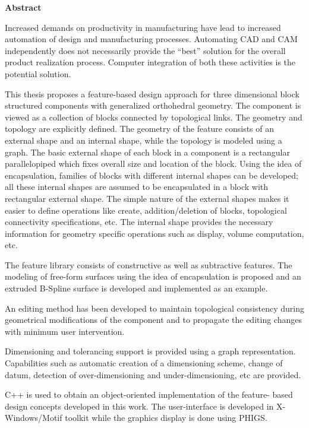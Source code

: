 \thispagestyle{empty}
\begin{center}
{\huge \bf {Abstract}}
\end{center}

\vspace{0.2in}

    Increased demands on productivity in manufacturing have lead to increased
	automation of design and manufacturing processes.
    Automating CAD and CAM independently does not necessarily provide the 
	``best'' solution for the overall product realization process.
	Computer integration of both these activities is the potential solution.

    This thesis proposes a feature-based design approach for three
    dimensional block structured components with generalized orthohedral
	geometry. 
	The component is viewed as a collection of blocks connected by 
	topological links. The geometry and topology are explicitly defined.
	The geometry of the feature consists of an external shape and an internal
	shape, while the topology is modeled using a graph. The basic external 
	shape of each block in a component is a rectangular parallelopiped which
	fixes overall size and location of the block.
	Using the idea of encapsulation, families of blocks with different internal 	shapes can be developed; all these internal shapes are assumed to be
	encapsulated in a block with rectangular external shape. The simple 
	nature
	of the external shapes makes it easier to define operations like create, 
	addition/deletion of blocks, topological connectivity specifications, etc.
	The internal shape provides the necessary information for geometry specific
	operations such as display, volume computation, etc.

    The feature library consists of constructive as well as subtractive 
	features. The modeling of free-form surfaces using the
	idea of encapsulation is proposed and an extruded B-Spline 
	surface is developed and implemented as an example.


	An editing method has been developed to maintain topological consistency 
	during geometrical modifications of the component and to propagate
	the editing changes with minimum user intervention.


	Dimensioning and tolerancing support is provided using a graph
	representation. Capabilities
	such as automatic creation of a dimensioning scheme, change of datum,
	detection of over-dimensioning and under-dimensioning, etc are provided.

    C++ is used to obtain an object-oriented implementation of the feature-
	based design concepts developed in this work.
    The user-interface is developed in X-Windows/Motif toolkit while the
    graphics display is done using PHIGS.


